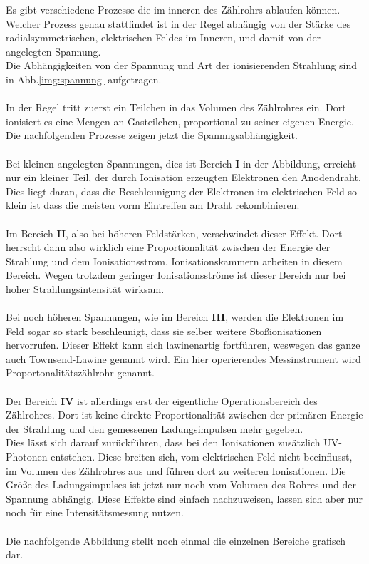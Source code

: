 \noindent
Es gibt verschiedene Prozesse die im inneren des Zählrohrs ablaufen können. 
Welcher Prozess genau stattfindet ist in der Regel abhängig von der Stärke des radialsymmetrischen, elektrischen Feldes im Inneren, und damit von der angelegten Spannung.\\
Die Abhängigkeiten von der Spannung und Art der ionisierenden Strahlung sind in Abb.\ref{img:spannung} aufgetragen.\\\\
In der Regel tritt zuerst ein Teilchen in das Volumen des Zählrohres ein. Dort ionisiert es eine Mengen an Gasteilchen, proportional zu seiner eigenen Energie.\\
Die nachfolgenden Prozesse zeigen jetzt die Spannngsabhängigkeit.\\\\
Bei kleinen angelegten Spannungen, dies ist Bereich \textbf{I} in der Abbildung, erreicht nur ein kleiner Teil, der durch Ionisation erzeugten Elektronen den Anodendraht. 
Dies liegt daran, dass die Beschleunigung der Elektronen im elektrischen Feld so klein ist dass die meisten vorm Eintreffen am Draht rekombinieren. \\\\
Im Bereich \textbf{II}, also bei höheren Feldstärken, verschwindet dieser Effekt. Dort herrscht dann also wirklich eine Proportionalität zwischen der Energie der Strahlung und dem Ionisationsstrom.
Ionisationskammern arbeiten in diesem Bereich. Wegen trotzdem geringer Ionisationsströme ist dieser Bereich nur bei hoher Strahlungsintensität wirksam.\\\\
Bei noch höheren Spannungen, wie im Bereich \textbf{III}, werden die Elektronen im Feld sogar so stark beschleunigt, dass sie selber weitere Stoßionisationen hervorrufen.
Dieser Effekt kann sich lawinenartig fortführen, weswegen das ganze auch Townsend-Lawine genannt wird. 
Ein hier operierendes Messinstrument wird Proportonalitätszählrohr genannt.\\\\
Der Bereich \textbf{IV} ist allerdings erst der eigentliche Operationsbereich des Zählrohres. 
Dort ist keine direkte Proportionalität zwischen der primären Energie der Strahlung und den gemessenen Ladungsimpulsen mehr gegeben.\\
Dies lässt sich darauf zurückführen, dass bei den Ionisationen zusätzlich UV-Photonen entstehen.
Diese breiten sich, vom elektrischen Feld nicht beeinflusst, im Volumen des Zählrohres aus und führen dort zu weiteren Ionisationen.
Die Größe des Ladungsimpulses ist jetzt nur noch vom Volumen des Rohres und der Spannung abhängig.
Diese Effekte sind einfach nachzuweisen, lassen sich aber nur noch für eine Intensitätsmessung nutzen.\\\\
Die nachfolgende Abbildung stellt noch einmal die einzelnen Bereiche grafisch dar.

